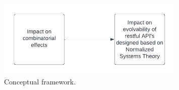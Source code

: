 \begin{figure}
    \centering
    \includegraphics[width=0.8\textwidth]{Figures/conceptual_framework}
    \decoRule
    \caption[Conceptual framework]{Conceptual framework.}
    \label{fig:conceptual_framework}
\end{figure}